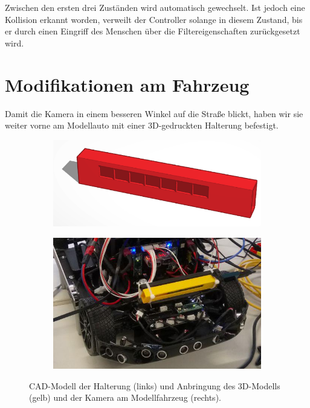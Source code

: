 \documentclass[a4paper,12pt]{report}
\begin{document}
	Zwischen den ersten drei Zuständen wird automatisch gewechselt.
	Ist jedoch eine Kollision erkannt worden, verweilt der Controller solange in diesem Zustand, bis er durch einen Eingriff des Menschen über die Filtereigenschaften zurückgesetzt wird.

\chapter{Modifikationen am Fahrzeug}

Damit die Kamera in einem besseren Winkel auf die Straße blickt, haben wir sie weiter vorne am Modellauto mit einer 3D-gedruckten Halterung befestigt. 
\begin{figure}[ht]
	\centering
	\begin{subfigure}[c]{.45\textwidth}
		\includegraphics[width=\textwidth]{assets/Kamerahalterung.PNG}
	\end{subfigure}
	\begin{subfigure}[c]{.45\textwidth}
		\includegraphics[width=\textwidth]{assets/Kamera-Anbringung.jpg}
	\end{subfigure}
	\caption{CAD-Modell der Halterung (links) und Anbringung des 3D-Modells (gelb) und der Kamera am Modellfahrzeug (rechts).}
	\label{img-camera}
\end{figure}
\end{document}
